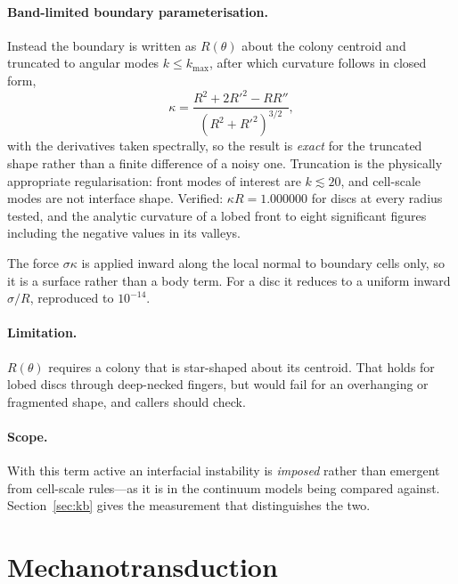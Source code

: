\documentclass[11pt]{article}
\begin{document}
\paragraph{Band-limited boundary parameterisation.} Instead the boundary is
written as $R(\theta)$ about the colony centroid and truncated to angular modes
$k\le k_{\max}$, after which curvature follows in closed form,
\begin{equation}
  \kappa = \frac{R^2 + 2R'^2 - RR''}{\left(R^2+R'^2\right)^{3/2}},
\end{equation}
with the derivatives taken spectrally, so the result is \emph{exact} for the
truncated shape rather than a finite difference of a noisy one. Truncation is the
physically appropriate regularisation: front modes of interest are $k\lesssim 20$,
and cell-scale modes are not interface shape. Verified: $\kappa R = 1.000000$ for
discs at every radius tested, and the analytic curvature of a lobed front to
eight significant figures including the negative values in its valleys.

The force $\sigma\kappa$ is applied inward along the local normal to boundary
cells only, so it is a surface rather than a body term. For a disc it reduces to
a uniform inward $\sigma/R$, reproduced to $10^{-14}$.

\paragraph{Limitation.} $R(\theta)$ requires a colony that is star-shaped about
its centroid. That holds for lobed discs through deep-necked fingers, but would
fail for an overhanging or fragmented shape, and callers should check.

\paragraph{Scope.} With this term active an interfacial instability is
\emph{imposed} rather than emergent from cell-scale rules---as it is in the
continuum models being compared against. Section~\ref{sec:kb} gives the
measurement that distinguishes the two.

\section{Mechanotransduction}\label{sec:mechano}
\end{document}
